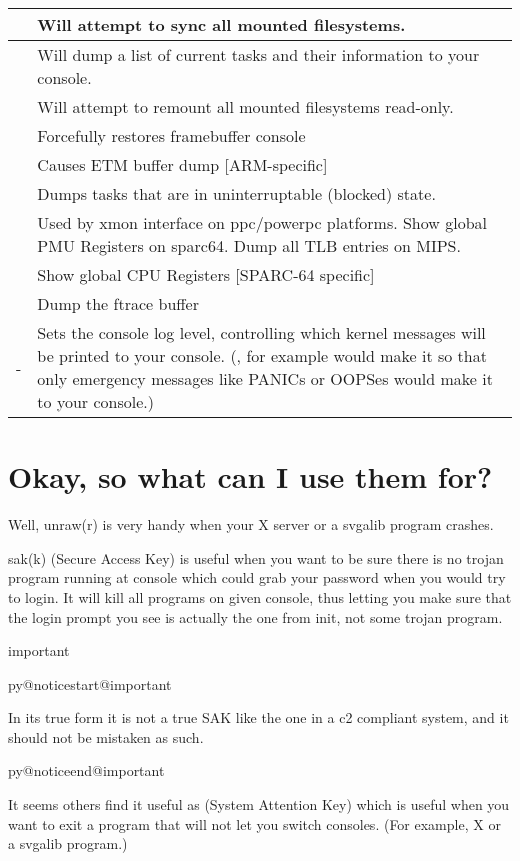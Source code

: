 \documentclass[a4paper,8pt,english]{sphinxmanual}
\makeatletter
\renewenvironment{notice}[2]{%
          \def\py@noticetype{#1}
          \begin{coloredbox}{#1}
          \bf\it
          \par\strong{#2}
          \csname py@noticestart@#1\endcsname
        }
	{
          \csname py@noticeend@\py@noticetype\endcsname
          \end{coloredbox}
        }
\makeatother
\begin{document}
\begin{tabulary}{\linewidth}{|L|L|}
\\
\hline
{}
 & 
Will attempt to sync all mounted filesystems.
\\
\hline
{}
 & 
Will dump a list of current tasks and their information to your
console.
\\
\hline
{}
 & 
Will attempt to remount all mounted filesystems read-only.
\\
\hline
{}
 & 
Forcefully restores framebuffer console
\\
\hline
{}
 & 
Causes ETM buffer dump {[}ARM-specific{]}
\\
\hline
{}
 & 
Dumps tasks that are in uninterruptable (blocked) state.
\\
\hline
{}
 & 
Used by xmon interface on ppc/powerpc platforms.
Show global PMU Registers on sparc64.
Dump all TLB entries on MIPS.
\\
\hline
{}
 & 
Show global CPU Registers {[}SPARC-64 specific{]}
\\
\hline
{}
 & 
Dump the ftrace buffer
\\
\hline
{}-
 & 
Sets the console log level, controlling which kernel messages
will be printed to your console. (, for example would make
it so that only emergency messages like PANICs or OOPSes would
make it to your console.)
\\
\hline\end{tabulary}



\section{Okay, so what can I use them for?}
\label{admin-guide/sysrq:okay-so-what-can-i-use-them-for}
Well, unraw(r) is very handy when your X server or a svgalib program crashes.

sak(k) (Secure Access Key) is useful when you want to be sure there is no
trojan program running at console which could grab your password
when you would try to login. It will kill all programs on given console,
thus letting you make sure that the login prompt you see is actually
the one from init, not some trojan program.

\begin{notice}{important}{Important:}
In its true form it is not a true SAK like the one in a
c2 compliant system, and it should not be mistaken as
such.
\end{notice}

It seems others find it useful as (System Attention Key) which is
useful when you want to exit a program that will not let you switch consoles.
(For example, X or a svgalib program.)
\end{document}
